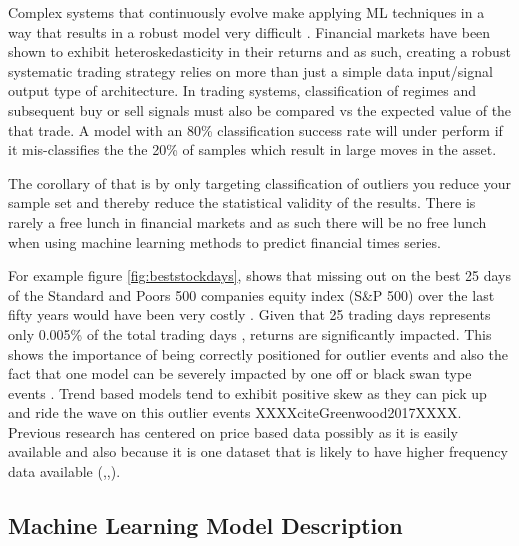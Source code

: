 \documentclass[11pt]{article}
\begin{document}
Complex systems that continuously evolve make applying ML techniques in a way that results in a robust model very difficult \cite{Arnott2018}. Financial markets have been shown to exhibit heteroskedasticity in their returns \cite{Corhay1996} and as such, creating a robust systematic trading strategy relies on more than just a simple data input/signal output type of architecture. In trading systems, classification of regimes and subsequent buy or sell signals must also be compared vs the expected value of the that trade. A model with an 80\% classification success rate will under perform if it mis-classifies the the 20\% of samples which result in large moves in the asset. \par
 The corollary of that is by only targeting classification of outliers you reduce your sample set and thereby reduce the statistical validity of the results. There is rarely a free lunch in financial markets and as such there will be no free lunch when using machine learning methods to predict financial times series. 
\par
For example figure \ref{fig:beststockdays}, shows that missing out on the best 25 days of the Standard and Poors 500 companies equity index (S\&P 500) over the last fifty years would have been very costly \cite{bestdays}. Given that 25 trading days represents only 0.005\% of the total trading days , returns are significantly impacted. This shows the importance of being correctly positioned for outlier events and also the fact that one model can be severely impacted by one off or black swan type events \cite{Taleb2007}. Trend based models tend to exhibit positive skew as they can pick up and ride the wave on this outlier events XXXXciteGreenwood2017XXXX.
Previous research has centered on price based data possibly as it is easily available and also because it is one dataset that is likely to have higher frequency data available (\cite{Huang2005},\cite{Shen2012},\cite{Wang2014}). 

\subsection{Machine Learning Model Description}
\end{document}
